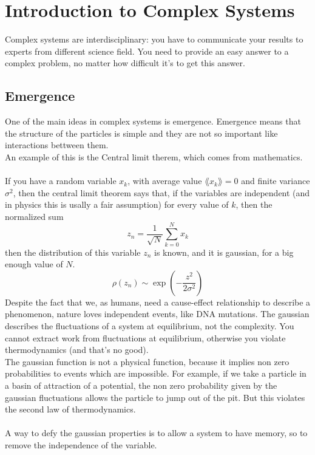 \chapter{Introduction to Complex Systems}
Complex systems are interdisciplinary: you have to communicate your results to experts from different science field.
You need to provide an easy answer to a complex problem, no matter how difficult it's to get this answer.

\section{Emergence}
One of the main ideas in complex systems is emergence. Emergence means that the structure of the particles is simple and they are not so important like interactions bettween them. \\
An example of this is the Central limit therem, which comes from mathematics. \\ \\
If you have a random variable $x_k$, with average value $\lang x_k \rang = 0$ and finite variance $\sigma^2$, then the central limit theorem says that, if the variables are independent (and in physics this is usally a fair assumption) for every value of $k$, then the normalized sum 
$$
	z_n = \frac{1}{\sqrt{N}}\sum_{k=0}^N x_k
$$
then the distribution of this variable $z_n$ is known, and it is gaussian, for a big enough value of $N$.
$$
	\rho(z_n) \sim \exp\left(-\frac{z^2}{2\sigma^2}\right)
$$
Despite the fact that we, as humans, need a cause-effect relationship to describe a phenomenon, nature loves independent events, like DNA mutations.
The gaussian describes the fluctuations of a system at equilibrium, not the complexity. You cannot extract work from fluctuations at equilibrium, otherwise you violate thermodynamics (and that's no good). \\
The gaussian function is not a physical function, because it implies non zero probabilities to events which are impossible. For example, if we take a particle in a basin of attraction of a potential, the non zero probability given by the gaussian fluctuations allows the particle to jump out of the pit. But this violates the second law of thermodynamics. \\ \\
A way to defy the gaussian properties is to allow a system to have memory, so to remove the independence of the variable. 
